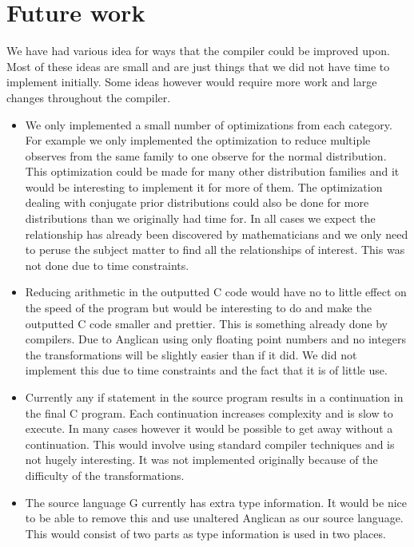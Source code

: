 \documentclass[a4paper]{article}
\begin{document}
\section{Future work}

We have had various idea for ways that the compiler could be improved upon. Most of these ideas are small and are just things that we did not have time to implement initially. Some ideas however would require more work and large changes throughout the compiler.

\begin{itemize}
\item
	We only implemented a small number of optimizations from each category. For example we only implemented the optimization to reduce multiple observes from the same family to one observe for the normal distribution. This optimization could be made for many other distribution families and it would be interesting to implement it for more of them. The optimization dealing with conjugate prior distributions could also be done for more distributions than we originally had time for. In all cases we expect the relationship has already been discovered by mathematicians and we only need to peruse the subject matter to find all the relationships of interest. This was not done due to time constraints.

\item
	Reducing arithmetic in the outputted C code would have no to little effect on the speed of the program but would be interesting to do and make the outputted C code smaller and prettier. This is something already done by compilers. Due to Anglican using only floating point numbers and no integers the transformations will be slightly easier than if it did. We did not implement this due to time constraints and the fact that it is of little use.

\item
	Currently any if statement in the source program results in a continuation in the final C program. Each continuation increases complexity and is slow to execute. In many cases however it would be possible to get away without a continuation. This would involve using standard compiler techniques and is not hugely interesting. It was not implemented originally because of the difficulty of the transformations.

\item
	The source language G currently has extra type information. It would be nice to be able to remove this and use unaltered Anglican as our source language. This would consist of two parts as type information is used in two places.


\end{itemize}
\end{document}

